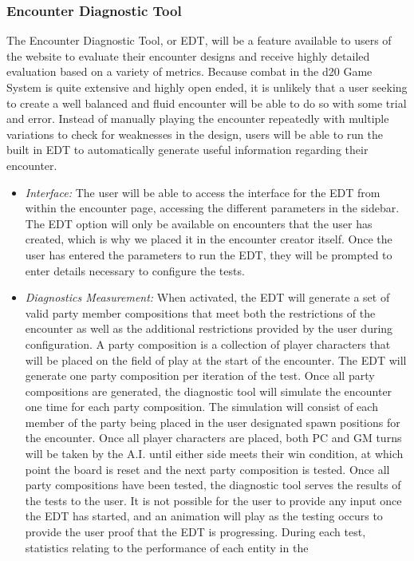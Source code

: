 \documentclass[letterpaper, 10 pt, conference]{ieeeconf}
\begin{document}
\subsubsection{Encounter Diagnostic Tool}
The Encounter Diagnostic Tool, or EDT, will be a feature available to
users of the website to evaluate their encounter designs and receive highly detailed
evaluation based on a variety of metrics. Because combat in the d20 Game System
is quite extensive and highly open ended, it is unlikely that a user seeking to
create a well balanced and fluid encounter will be able to do so with some trial
and error. Instead of manually playing the encounter repeatedly with multiple
variations to check for weaknesses in the design, users will be able to run the
built in EDT to automatically generate useful information
regarding their encounter.
\begin{itemize}
	\item \textit{Interface:} The user will be able to access the interface for the EDT
	from within the encounter page, accessing the different parameters in the sidebar.
	The EDT option will only be available on encounters that
	the user has created, which is why we placed it in the encounter creator itself.
	Once the user has entered the parameters to run the EDT, they
	will be prompted to enter details necessary to configure the tests.
	\item \textit{Diagnostics Measurement:} When activated, the EDT will generate a set of valid party
	member compositions that meet both the restrictions of the encounter as well as
	the additional restrictions provided by the user during configuration. A party
	composition is a collection of player characters that will be placed on the field of
	play at the start of the encounter. The EDT will generate one party
	composition per iteration of the test. Once all party compositions are generated,
	the diagnostic tool will simulate the encounter one time for each party composition.
	The simulation will consist of each member of the party being placed in the
	user designated spawn positions for the encounter. Once all player characters
	are placed, both PC and GM turns will be taken by the A.I. until either side
	meets their win condition, at which point the board is reset and the next party
	composition is tested. Once all party compositions have been tested, the diagnostic
	tool serves the results of the tests to the user. It is not possible for the user to provide any input once the EDT has started, and an animation will play as the testing occurs to provide the user proof that the EDT is progressing. During each test, statistics relating to the performance of each entity in the

\end{itemize}
\end{document}
